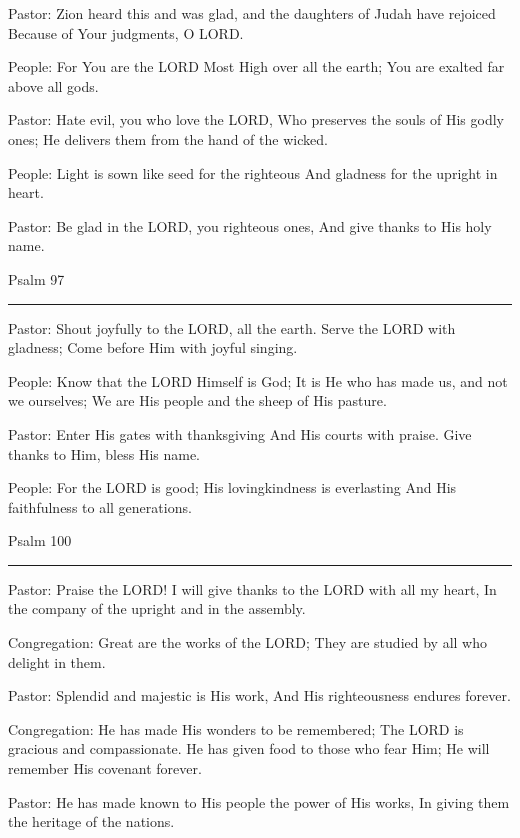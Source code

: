 \documentclass[]{book}
\begin{document}
Pastor: Zion heard this and was glad, and the daughters of Judah have
rejoiced Because of Your judgments, O LORD.

People: For You are the LORD Most High over all the earth; You are
exalted far above all gods.

Pastor: Hate evil, you who love the LORD, Who preserves the souls of His
godly ones; He delivers them from the hand of the wicked.

People: Light is sown like seed for the righteous And gladness for the
upright in heart.

Pastor: Be glad in the LORD, you righteous ones, And give thanks to His
holy name.

Psalm 97 \textbar{}

\begin{center}\rule{0.5\linewidth}{\linethickness}\end{center}

Pastor: Shout joyfully to the LORD, all the earth. Serve the LORD with
gladness; Come before Him with joyful singing.

People: Know that the LORD Himself is God; It is He who has made us, and
not we ourselves; We are His people and the sheep of His pasture.

Pastor: Enter His gates with thanksgiving And His courts with praise.
Give thanks to Him, bless His name.

People: For the LORD is good; His lovingkindness is everlasting And His
faithfulness to all generations.

Psalm 100 \textbar{}

\begin{center}\rule{0.5\linewidth}{\linethickness}\end{center}

Pastor: Praise the LORD! I will give thanks to the LORD with all my
heart, In the company of the upright and in the assembly.

Congregation: Great are the works of the LORD; They are studied by all
who delight in them.

Pastor: Splendid and majestic is His work, And His righteousness endures
forever.

Congregation: He has made His wonders to be remembered; The LORD is
gracious and compassionate. He has given food to those who fear Him; He
will remember His covenant forever.

Pastor: He has made known to His people the power of His works, In
giving them the heritage of the nations.
\end{document}
